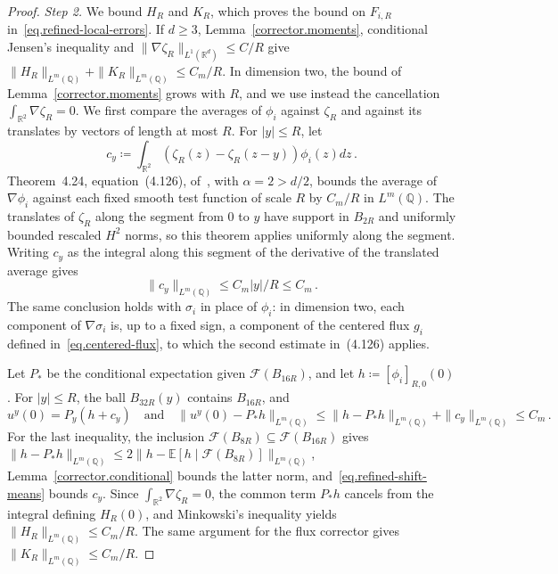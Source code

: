 \documentclass[11pt]{amsart}
\theoremstyle{definition}
\theoremstyle{remark}
\numberwithin{equation}{section}
\newcommand{\E}{\mathbb E}
\newcommand{\Q}{\mathbb Q}
\newcommand{\R}{\mathbb R}
\begin{document}
\begin{proof}
\emph{Step 2.} We bound $H_R$ and $K_R$, which proves the bound on $F_{i,R}$ in~\eqref{eq.refined-local-errors}. If $d\geq3$, Lemma~\ref{corrector.moments}, conditional Jensen's inequality and $\|\nabla\zeta_R\|_{L^1(\R^d)}\leq C/R$ give $\|H_R\|_{L^m(\Q)}+\|K_R\|_{L^m(\Q)}\leq C_m/R$. In dimension two, the bound of Lemma~\ref{corrector.moments} grows with $R$, and we use instead the cancellation $\int_{\R^2}\nabla\zeta_R=0$. We first compare the averages of $\phi_i$ against $\zeta_R$ and against its translates by vectors of length at most $R$. For $|y|\leq R$, let
\begin{equation*}
 c_y\coloneqq\int_{\R^2}(\zeta_R(z)-\zeta_R(z-y))\phi_i(z)dz\, .
\end{equation*}
Theorem~4.24, equation~(4.126), of~\citet{AKM2019book}, with $\alpha=2>d/2$, bounds the average of $\nabla\phi_i$ against each fixed smooth test function of scale $R$ by $C_m/R$ in $L^m(\Q)$. The translates of $\zeta_R$ along the segment from $0$ to $y$ have support in $B_{2R}$ and uniformly bounded rescaled $H^2$ norms, so this theorem applies uniformly along the segment. Writing $c_y$ as the integral along this segment of the derivative of the translated average gives
\begin{equation}\label{eq.refined-shift-means}
 \|c_y\|_{L^m(\Q)}\leq C_m|y|/R\leq C_m\, .
\end{equation}
The same conclusion holds with $\sigma_i$ in place of $\phi_i$: in dimension two, each component of $\nabla\sigma_i$ is, up to a fixed sign, a component of the centered flux $g_i$ defined in~\eqref{eq.centered-flux}, to which the second estimate in~(4.126) applies.

Let $P_*$ be the conditional expectation given $\mathcal F(B_{16R})$, and let $h\coloneqq[\phi_i]_{R,0}(0)$. For $|y|\leq R$, the ball $B_{32R}(y)$ contains $B_{16R}$, and
\begin{equation*}
 u^y(0)=P_y(h+c_y)
 \quad\text{and}\quad
 \|u^y(0)-P_*h\|_{L^m(\Q)}
 \leq\|h-P_*h\|_{L^m(\Q)}+\|c_y\|_{L^m(\Q)}\leq C_m\, .
\end{equation*}
For the last inequality, the inclusion $\mathcal F(B_{8R})\subseteq\mathcal F(B_{16R})$ gives $\|h-P_*h\|_{L^m(\Q)}\leq2\|h-\E[h\mid\mathcal F(B_{8R})]\|_{L^m(\Q)}$, Lemma~\ref{corrector.conditional} bounds the latter norm, and~\eqref{eq.refined-shift-means} bounds $c_y$. Since $\int_{\R^2}\nabla\zeta_R=0$, the common term $P_*h$ cancels from the integral defining $H_R(0)$, and Minkowski's inequality yields $\|H_R\|_{L^m(\Q)}\leq C_m/R$. The same argument for the flux corrector gives $\|K_R\|_{L^m(\Q)}\leq C_m/R$.


\end{proof}
\end{document}
